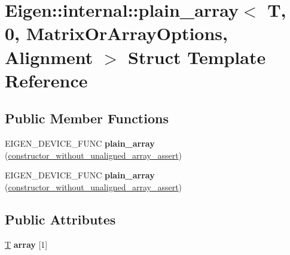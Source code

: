 \hypertarget{struct_eigen_1_1internal_1_1plain__array_3_01_t_00_010_00_01_matrix_or_array_options_00_01_alignment_01_4}{}\section{Eigen\+:\+:internal\+:\+:plain\+\_\+array$<$ T, 0, Matrix\+Or\+Array\+Options, Alignment $>$ Struct Template Reference}
\label{struct_eigen_1_1internal_1_1plain__array_3_01_t_00_010_00_01_matrix_or_array_options_00_01_alignment_01_4}
\subsection*{Public Member Functions}
\begin{DoxyCompactItemize}
\item 
\mbox{\label{struct_eigen_1_1internal_1_1plain__array_3_01_t_00_010_00_01_matrix_or_array_options_00_01_alignment_01_4_a2000037e51cb24ea3a7500bf94102cb2}} 
E\+I\+G\+E\+N\+\_\+\+D\+E\+V\+I\+C\+E\+\_\+\+F\+U\+NC {\bfseries plain\+\_\+array} (\hyperlink{struct_eigen_1_1internal_1_1constructor__without__unaligned__array__assert}{constructor\+\_\+without\+\_\+unaligned\+\_\+array\+\_\+assert})
\item 
\mbox{\label{struct_eigen_1_1internal_1_1plain__array_3_01_t_00_010_00_01_matrix_or_array_options_00_01_alignment_01_4_a2000037e51cb24ea3a7500bf94102cb2}} 
E\+I\+G\+E\+N\+\_\+\+D\+E\+V\+I\+C\+E\+\_\+\+F\+U\+NC {\bfseries plain\+\_\+array} (\hyperlink{struct_eigen_1_1internal_1_1constructor__without__unaligned__array__assert}{constructor\+\_\+without\+\_\+unaligned\+\_\+array\+\_\+assert})
\end{DoxyCompactItemize}
\subsection*{Public Attributes}
\begin{DoxyCompactItemize}
\item 
\mbox{\label{struct_eigen_1_1internal_1_1plain__array_3_01_t_00_010_00_01_matrix_or_array_options_00_01_alignment_01_4_a54bb2fb4a77608091e4b680a41791e36}} 
\hyperlink{group___sparse_core___module}{T} {\bfseries array} \mbox{[}1\mbox{]}
\end{DoxyCompactItemize}


